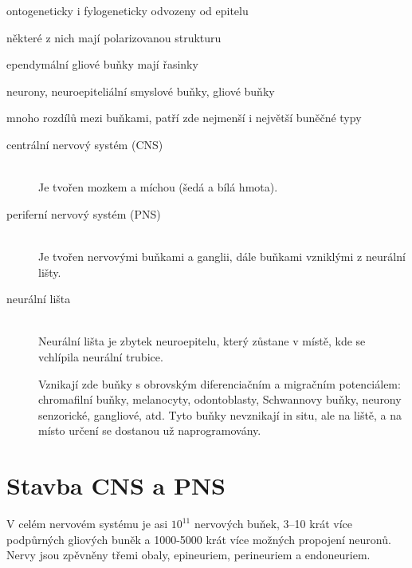 \documentclass[DIV=8]{scrreprt}
\begin{document}
\begin{myItemize}[nosep]
    \item ontogeneticky i fylogeneticky odvozeny od epitelu
\begin{myItemize}[nosep]
    \item některé z nich mají polarizovanou strukturu
    \item ependymální gliové buňky mají řasinky
\end{myItemize}

    \item neurony, neuroepiteliální smyslové buňky, gliové buňky
    \item mnoho rozdílů mezi buňkami, patří zde nejmenší i největší buněčné typy
\end{myItemize}



\begin{description}
\item[centrální nervový systém (CNS)]\hfill \\
Je tvořen mozkem a míchou (šedá a bílá hmota).


\item[periferní nervový systém (PNS)]\hfill \\
Je tvořen nervovými buňkami a ganglii, dále buňkami vzniklými z neurální lišty.


\item[neurální lišta]\hfill \\
Neurální lišta je zbytek neuroepitelu, který zůstane v místě, kde se vchlípila neurální trubice.

Vznikají zde buňky s obrovským diferenciačním a migračním potenciálem: chromafilní buňky, melanocyty, odontoblasty, Schwannovy buňky, neurony senzorické, gangliové, atd. Tyto buňky nevznikají in situ, ale na liště, a na místo určení se dostanou už naprogramovány.


\end{description}


\section{Stavba CNS a PNS} \label{Stavba CNS a PNS} \FloatBarrier


V celém nervovém systému je asi \(10^{11}\) nervových buňek, 3--10 krát více podpůrných gliových buněk a 1000-5000 krát více možných propojení neuronů. Nervy jsou zpěvněny třemi obaly, epineuriem, perineuriem a endoneuriem.
\end{document}
